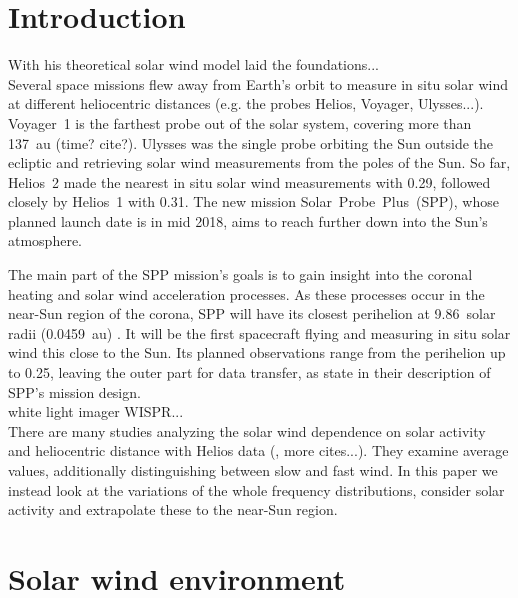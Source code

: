 \section{Introduction}

With his theoretical solar wind model \citet{Parker1958} laid the foundations...\\

Several space missions flew away from Earth's orbit to measure in situ solar wind at different heliocentric distances (e.g. the probes Helios, Voyager, Ulysses...). Voyager~1 is the farthest probe out of the solar system, covering more than 137~au (time? cite?). Ulysses was the single probe orbiting the Sun outside the ecliptic and retrieving solar wind measurements from the poles of the Sun. So far, Helios~2 made the nearest in situ solar wind measurements with \SI{0.29}{\au}, followed closely by Helios~1 with \SI{0.31}{\au}. The new mission Solar~Probe~Plus~(SPP), whose planned launch date is in mid 2018, aims to reach further down into the Sun's atmosphere.

The main part of the SPP mission's goals is to gain insight into the coronal heating and solar wind acceleration processes. As these processes occur in the near-Sun region of the corona, SPP will have its closest perihelion at 9.86~solar radii (0.0459~au) \citep{Fox2015}. It will be the first spacecraft flying and measuring in situ solar wind this close to the Sun. Its planned observations range from the perihelion up to \SI{0.25}{\au}, leaving the outer part for data transfer, as \citet{Fox2015} state in their description of SPP's mission design.\\

white light imager WISPR... \citep{Vourlidas2016}\\

There are many studies analyzing the solar wind dependence on solar activity and heliocentric distance with Helios data (\citet{Schwenn1983, Bougeret1984, Schwenn1990}, more cites...). They examine average values, additionally distinguishing between slow and fast wind. In this paper we instead look at the variations of the whole frequency distributions, consider solar activity and extrapolate these to the near-Sun region.\\


\section{Solar wind environment}

